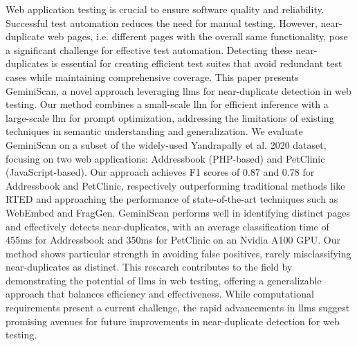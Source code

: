
\begin{itemize}
    Web application testing is crucial to ensure software quality and reliability. Successful test automation reduces the need for manual testing. However, near-duplicate web pages, i.e. different pages with the overall same functionality, pose a significant challenge for effective test automation. Detecting these near-duplicates is essential for creating efficient test suites that avoid redundant test cases while maintaining comprehensive coverage. This paper presents GeminiScan, a novel approach leveraging \acp{llm} for near-duplicate detection in web testing. Our method combines a small-scale \ac{llm} for efficient inference with a large-scale \ac{llm} for prompt optimization, addressing the limitations of existing techniques in semantic understanding and generalization.
    We evaluate GeminiScan on a subset of the widely-used Yandrapally et al. 2020 dataset, focusing on two web applications: Addressbook (PHP-based) and PetClinic (JavaScript-based). Our approach achieves F1 scores of 0.87 and 0.78 for Addressbook and PetClinic, respectively outperforming traditional methods like RTED and approaching the performance of state-of-the-art techniques such as WebEmbed and FragGen.
    GeminiScan performs well in identifying distinct pages and effectively detects near-duplicates, with an average classification time of 455ms for Addressbook and 350ms for PetClinic on an Nvidia A100 GPU. Our method shows particular strength in avoiding false positives, rarely misclassifying near-duplicates as distinct.
    This research contributes to the field by demonstrating the potential of \acp{llm} in web testing, offering a generalizable approach that balances efficiency and effectiveness. While computational requirements present a current challenge, the rapid advancements in \acp{llm} suggest promising avenues for future improvements in near-duplicate detection for web testing.
\end{itemize}


